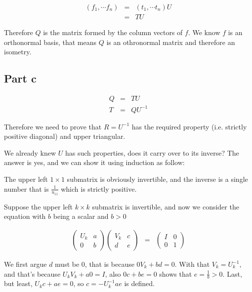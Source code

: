 \begin{eqnarray*}
  (f_1, \cdots f_n) &=& (t_1, \cdots t_n) U \\
                    &=& TU
\end{eqnarray*}

Therefore $ Q $ is the matrix formed by the column vectors of $ f $. We know $ f $ is an orthonormal basis, that means $ Q $ is an othronormal matrix and therefore an isometry.

\subsection*{Part c}
\begin{eqnarray*}
  Q &=& TU \\
  T &=& QU^{-1} 
\end{eqnarray*}

Therefore we need to prove that $ R = U^{-1} $ has the required property (i.e. strictly positive diagonal) and upper triangular.

We already knew $ U $ has such properties, does it carry over to its inverse? The answer is yes, and we can show it using induction as follow:

The upper left $ 1 \times 1 $ submatrix is obviously invertible, and the inverse is a single number that is $ \frac{1}{u_{11}} $ which is strictly positive.

Suppose the upper left $ k \times k $ submatrix is invertible, and now we consider the equation with $ b $ being a scalar and $ b > 0 $

\begin{eqnarray*}
  \left(\begin{array}{cc}
    U_k & a \\
    0   & b
  \end{array}\right)\left(\begin{array}{cc}
    V_k & c \\
    d   & e
  \end{array}\right) &=& \left(\begin{array}{cc}
  I & 0 \\
  0 & 1
  \end{array}\right)
\end{eqnarray*}

We first argue $ d $ must be 0, that is because $ 0 V_k + bd = 0 $. With that $ V_k = U^{-1}_k $, and that's because $ U_kV_k + a 0 = I $, also $ 0 c + b e = 0 $ shows that $ e = \frac{1}{b} > 0 $. Last, but least, $ U_k c+ a e = 0 $, so $ c = - U^{-1}_k ae $ is defined. 

